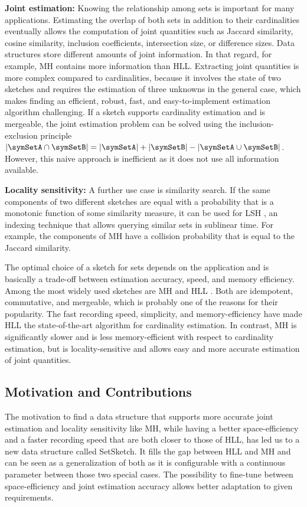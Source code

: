 \documentclass[sigconf, nonacm]{acmart}
\begin{document}
\noindent\textbf{Joint estimation:}
Knowing the relationship among sets is important for many applications. Estimating the overlap of both sets in addition to their cardinalities eventually allows the computation of joint quantities such as Jaccard similarity, cosine similarity, inclusion coefficients, intersection size, or difference sizes. Data structures store different amounts of joint information. In that regard, for example, \ac{MH} contains more information than \ac{HLL}. Extracting joint quantities is more complex compared to cardinalities, because it involves the state of two sketches and requires the estimation of three unknowns in the general case, which makes finding an efficient, robust, fast, and easy-to-implement estimation algorithm challenging. If a sketch supports cardinality estimation and is mergeable, the joint estimation problem can be solved using the inclusion-exclusion principle $|\symSetA\cap\symSetB| = |\symSetA| + |\symSetB| - |\symSetA\cup\symSetB|$. However, this naive approach is inefficient as it does not use all information available.

\noindent\textbf{Locality sensitivity:}
A further use case is similarity search. If the same components of two different sketches are equal with a probability that is a monotonic function of some similarity measure, it can be used for \ac{LSH} \cite{Indyk1998, Bawa2005, Lv2007,Zhu2016}, an indexing technique that allows querying similar sets in sublinear time. For example, the components of \ac{MH} have a collision probability that is equal to the Jaccard similarity.

The optimal choice of a sketch for sets depends on the application and is basically a trade-off between estimation accuracy, speed, and memory efficiency. Among the most widely used sketches are \ac{MH} \cite{Broder1997} and \ac{HLL} \cite{Flajolet2007}. Both are idempotent, commutative, and mergeable, which is probably one of the reasons for their popularity. The fast recording speed, simplicity, and memory-efficiency have made \ac{HLL} the state-of-the-art algorithm for cardinality estimation. In contrast, \ac{MH} is significantly slower and is less memory-efficient with respect to cardinality estimation, but is locality-sensitive and allows easy and more accurate estimation of joint quantities.

\subsection{Motivation and Contributions}
The motivation to find a data structure that supports more accurate joint estimation and locality sensitivity like \ac{MH}, while having a better space-efficiency and a faster recording speed that are both closer to those of \ac{HLL}, has led us to a new data structure called SetSketch. It fills the gap between \ac{HLL} and \ac{MH} and can be seen as a generalization of both as it is configurable with a continuous parameter between those two special cases. The possibility to fine-tune between space-efficiency and joint estimation accuracy allows better adaptation to given requirements.
\end{document}
